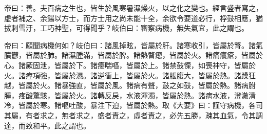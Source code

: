 \documentclass[draft,12pt]{ctexbook}
\begin{document}
\begin{yuanwen}
帝曰：善。夫百病之生也，皆生於風寒暑濕燥火，以之化之變也。經言盛者寫之，虛者補之、余鍚以方士，而方士用之尚未能十全，余欲令要道必行，桴鼓相應，猶拔刺雪汙，工巧神聖，可得聞乎？岐伯曰：審察病機，無失氣宜，此之謂也。

帝曰：願聞病機何如？岐伯曰：諸風掉眩，皆屬於肝。諸寒收引，皆屬於腎。諸氣膹鬱，皆屬於肺。諸濕腫滿，皆屬於脾。諸熱瞀瘛，皆屬於火。諸痛癢瘡，皆屬於心。諸厥固泄，皆屬於下。諸痿喘嘔，皆屬於上。諸禁鼓慄，如喪神守，皆屬於火。諸痙項強，皆屬於濕。諸逆衝上，皆屬於火。諸脹腹大，皆屬於熱。諸躁狂越，皆屬於火。諸暴強直，皆屬於風。諸病有聲，鼓之如鼓，皆屬於熱。諸病胕腫，疼酸驚駭，皆屬於火。諸轉反戾，水液渾濁，皆屬於熱。諸病水液，澄澈清冷，皆屬於寒。諸嘔吐酸，暴注下迫，皆屬於熱。取《大要》曰：謹守病機，各司其屬，有者求之，無者求之，盛者責之，虛者責之，必先五勝，疎其血氣，令其調達，而致和平。此之謂也。
\end{yuanwen}

\end{document}
